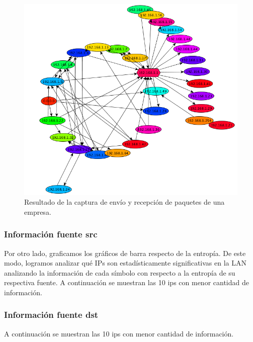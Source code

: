 \documentclass[10pt, a4paper]{article}
\begin{document}
\begin{figure}[H] %
\begin{center}
\includegraphics[width=400pt]{../imgs/tiargsa_entero.png}
\caption{Resultado de la captura de envío y recepción de paquetes de una empresa.}
\end{center}
\end{figure}

\subsubsection{Informaci\'on fuente src}
Por otro lado, graficamos los gráficos de barra respecto de la entropía. De este modo, logramos analizar qué IPs son estadísticamente significativas en la LAN analizando la información de cada símbolo con respecto a la entropía de su respectiva fuente.
A continuaci\'on se muestran las 10 ips con menor cantidad de informaci\'on.

%
\vspace{2cm}

\subsubsection{Informaci\'on fuente dst}
A continuaci\'on se muestran las 10 ips con menor cantidad de informaci\'on.

%
\vspace{2cm}
\end{document}
